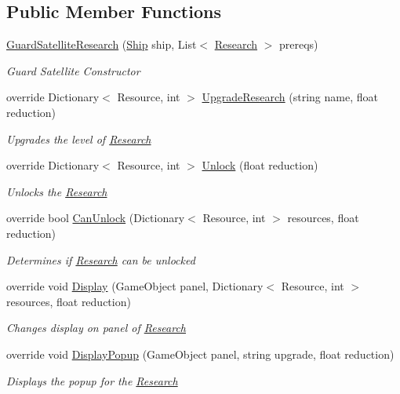 \subsection*{Public Member Functions}
\begin{DoxyCompactItemize}
\item 
\hyperlink{class_guard_satellite_research_a476a4ead2c4e32ed60716f3fdab005ce}{Guard\+Satellite\+Research} (\hyperlink{class_ship}{Ship} ship, List$<$ \hyperlink{class_research}{Research} $>$ prereqs)
\begin{DoxyCompactList}\small\item\em Guard Satellite Constructor \end{DoxyCompactList}\item 
override Dictionary$<$ Resource, int $>$ \hyperlink{class_guard_satellite_research_aa69bdb692be9ee8ff073a3f963fc4045}{Upgrade\+Research} (string name, float reduction)
\begin{DoxyCompactList}\small\item\em Upgrades the level of \hyperlink{class_research}{Research} \end{DoxyCompactList}\item 
override Dictionary$<$ Resource, int $>$ \hyperlink{class_guard_satellite_research_aca565da13490a14ba76ee05b99ecabe6}{Unlock} (float reduction)
\begin{DoxyCompactList}\small\item\em Unlocks the \hyperlink{class_research}{Research} \end{DoxyCompactList}\item 
override bool \hyperlink{class_guard_satellite_research_a0c3e6fbc59ec84c659f44309d69be30f}{Can\+Unlock} (Dictionary$<$ Resource, int $>$ resources, float reduction)
\begin{DoxyCompactList}\small\item\em Determines if \hyperlink{class_research}{Research} can be unlocked \end{DoxyCompactList}\item 
override void \hyperlink{class_guard_satellite_research_a2840eeb59aecef270a2ee73842cd7649}{Display} (Game\+Object panel, Dictionary$<$ Resource, int $>$ resources, float reduction)
\begin{DoxyCompactList}\small\item\em Changes display on panel of \hyperlink{class_research}{Research} \end{DoxyCompactList}\item 
override void \hyperlink{class_guard_satellite_research_a28a87325e2fc2fb666c715560f85a15a}{Display\+Popup} (Game\+Object panel, string upgrade, float reduction)
\begin{DoxyCompactList}\small\item\em Displays the popup for the \hyperlink{class_research}{Research} \end{DoxyCompactList}\end{DoxyCompactItemize}
